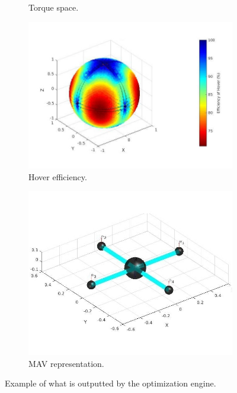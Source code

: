 \begin{figure}[!h]
\begin{subfigure}[b]{0.48\textwidth}
    \caption{Torque space.} \label{fig:tool_outputb}
  \end{subfigure}
  \hspace*{\fill} %
  \begin{subfigure}[b]{0.48\textwidth}
    \includegraphics[width=\linewidth]{images/n=4_hover.jpg}
    \caption{Hover efficiency.} \label{fig:tool_outputc}
  \end{subfigure}
  \hspace*{\fill} %
  \begin{subfigure}[b]{0.48\textwidth}
    \includegraphics[width=\linewidth]{images/n=4_model.jpg}
    \caption{MAV representation.} \label{fig:tool_outputd}
  \end{subfigure}
  \caption{Example of what is outputted by the optimization engine.}
  \label{fig:tool_output}
\end{figure}

